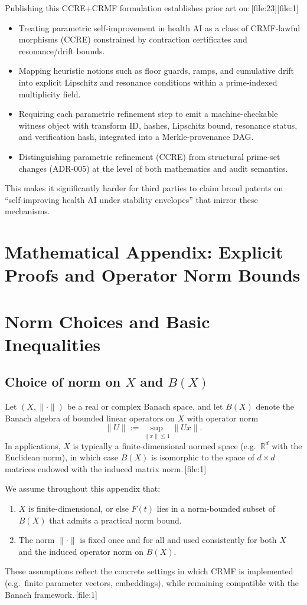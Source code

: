 \documentclass[11pt]{article}
\begin{document}
Publishing this CCRE+CRMF formulation establishes prior art on:\,[file:23][file:1]
\begin{itemize}[leftmargin=1.5em]
  \item Treating parametric self-improvement in health AI as a class of CRMF-lawful morphisms (CCRE) constrained by contraction certificates and resonance/drift bounds.
  \item Mapping heuristic notions such as floor guards, ramps, and cumulative drift into explicit Lipschitz and resonance conditions within a prime-indexed multiplicity field.
  \item Requiring each parametric refinement step to emit a machine-checkable witness object with transform ID, hashes, Lipschitz bound, resonance status, and verification hash, integrated into a Merkle-provenance DAG.
  \item Distinguishing parametric refinement (CCRE) from structural prime-set changes (ADR-005) at the level of both mathematics and audit semantics.
\end{itemize}
This makes it significantly harder for third parties to claim broad patents on ``self-improving health AI under stability envelopes'' that mirror these mechanisms.

\appendix
\section*{Mathematical Appendix: Explicit Proofs and Operator Norm Bounds}

\section{Norm Choices and Basic Inequalities}

\subsection{Choice of norm on $X$ and $B(X)$}

Let $(X,\|\cdot\|)$ be a real or complex Banach space, and let $B(X)$ denote the Banach algebra of bounded linear operators on $X$ with operator norm
\[
  \|U\| := \sup_{\|x\|\le 1} \|Ux\|.
\]
In applications, $X$ is typically a finite-dimensional normed space (e.g.\ $\mathbb{R}^d$ with the Euclidean norm), in which case $B(X)$ is isomorphic to the space of $d\times d$ matrices endowed with the induced matrix norm.\,[file:1]

We assume throughout this appendix that:
\begin{enumerate}
  \item $X$ is finite-dimensional, or else $F(t)$ lies in a norm-bounded subset of $B(X)$ that admits a practical norm bound.
  \item The norm $\|\cdot\|$ is fixed once and for all and used consistently for both $X$ and the induced operator norm on $B(X)$.
\end{enumerate}
These assumptions reflect the concrete settings in which CRMF is implemented (e.g.\ finite parameter vectors, embeddings), while remaining compatible with the Banach framework.\,[file:1]
\end{document}
